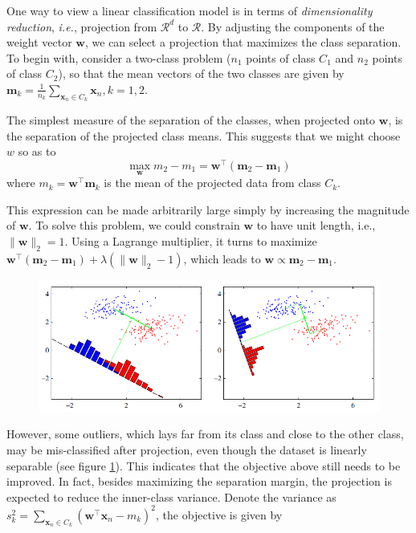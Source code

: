 \documentclass{article}
\begin{document}
	One way to view a linear classification model is in terms of \textit{dimensionality reduction}, \textit{i.e.}, projection from $\mathcal{R}^d$ to $\mathcal{R}$. By adjusting the components of the weight vector $\mathbf{w}$, we can select a projection that maximizes the class separation. To begin with, consider a two-class problem ($n_1$ points of class $C_1$ and $n_2$ points of class $C_2$), so that the mean vectors of the two classes are given by $\mathbf{m}_k = \frac{1}{n_k} \sum_{\mathbf{x}_n \in C_k} \mathbf{x}_n, k=1,2$.

	The simplest measure of the separation of the classes, when projected onto $\mathbf{w}$, is the separation of the projected class means. This suggests that we might choose $w$ so as to
	\begin{equation*}
	\max_\mathbf{w} m_2- m_1=\mathbf{w}^\top (\mathbf{m}_2-\mathbf{m}_1)
	\end{equation*}
where $m_k=\mathbf{w}^\top \mathbf{m}_k$ is the mean of the projected data from class $C_k$. 

	This expression can be made arbitrarily large simply by increasing the magnitude of $\mathbf{w}$. To solve this problem, we could constrain $\mathbf{w}$ to have unit length, i.e., $\|\mathbf{w}\|_2=1$. Using a Lagrange multiplier, it turns to maximize $\mathbf{w}^\top (\mathbf{m}_2-\mathbf{m}_1) + \lambda (\|\mathbf{w}\|_2-1)$, which leads to $\mathbf{w}\propto \mathbf{m}_2-\mathbf{m}_1$.
	
	\begin{figure}
	\includegraphics[scale=.7]{C4 fisher.png}	
	\label{fig4.1}
	\end{figure}
However, some outliers, which lays far from its class and close to the other class, may be mis-classified after projection, even though the dataset is linearly separable (see figure \ref{fig4.1}). This indicates that the objective above still needs to be improved. In fact, besides maximizing the separation margin, the projection is expected to reduce the inner-class variance. Denote the variance as $s_k^2=\sum_{\mathbf{x}_n\in C_k} (\mathbf{w}^\top\mathbf{x}_n-m_k)^2$, the objective is given by
	
\end{document}
